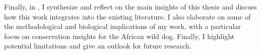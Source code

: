 \documentclass[../FinalThesis.tex]{subfiles}
\begin{document}

Finally, in , I synthesize and reflect on the main
insights of this thesis and discuss how this work integrates into the existing
literature. I also elaborate on some of the methodological and biological
implications of my work, with a particular focus on conservation insights for
the African wild dog. Finally, I highlight potential limitations and give an
outlook for future research.

\end{document}
